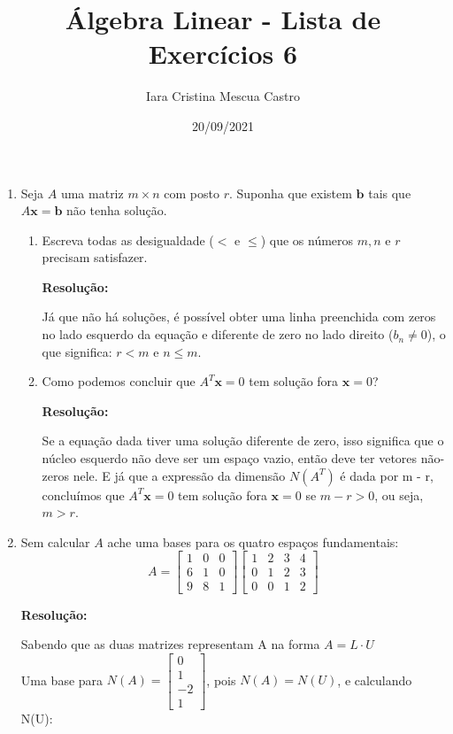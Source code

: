 \documentclass[leqno]{article}
\title{Álgebra Linear - Lista de Exercícios 6}
\author{Iara Cristina Mescua Castro}
\date{20/09/2021}
\numberwithin{equation}{section}
\theoremstyle{definition}
\newcommand{\bfx}{\mathbf{x}}
\newcommand{\bfb}{\mathbf{b}}
\newenvironment{sol}
	{
		\vspace{4mm}
		\noindent\textbf{Resolução:}
		\strut\newline
		\smallskip
		\hspace{-3.5mm}
	}
	{}
\begin{document}
		
	\maketitle
	
	\begin{enumerate}
		
		\item Seja $A$ uma matriz $m \times n$ com posto $r$. Suponha que existem $\bfb$ tais que $A \bfx = \bfb$ não tenha solução.
		
		\begin{enumerate}
			
			\item Escreva todas as desigualdade ($<$ e $\leq$) que os números $m,n$ e $r$ precisam satisfazer.
			
			\begin{sol} 
				Já que não há soluções, é possível obter uma linha preenchida com zeros no lado esquerdo da equação e diferente de zero no lado direito ($b_n \neq 0$), o que significa: $r < m$ e $n \leq m$.
			\end{sol} 
			
			\item Como podemos concluir que $A^T \bfx = 0$ tem solução fora $\bfx = 0$?
			
			\begin{sol} 
				Se a equação dada tiver uma solução diferente de zero, isso significa que o núcleo esquerdo não deve ser um espaço vazio, então deve ter vetores não-zeros nele. E já que a expressão da dimensão $N(A^T)$ é dada por m - r, concluímos que $A^T \bfx = 0$ tem solução fora $\bfx = 0$ se $m - r > 0$, ou seja, $m > r$.
			\end{sol} 
		\end{enumerate}
		
		\item Sem calcular $A$ ache uma bases para os quatro espaços fundamentais:
		$$A = \begin{bmatrix}
			1 & 0 & 0 \\
			6 & 1 & 0 \\
			9 & 8 & 1
		\end{bmatrix}
		\begin{bmatrix}
			1 & 2 & 3 & 4 \\
			0 & 1 & 2 & 3 \\
			0 & 0 & 1 & 2
		\end{bmatrix}$$
		
		\begin{sol} 
			Sabendo que as duas matrizes representam A na forma $A = L \cdot U$\\
		Uma base para $N(A) = \begin{bmatrix}
			0\\
			1\\
			-2\\
			1
		\end{bmatrix}$, pois $N(A) =  N(U)$, e calculando N(U):
	

\end{sol}
\end{enumerate}
\end{document}
